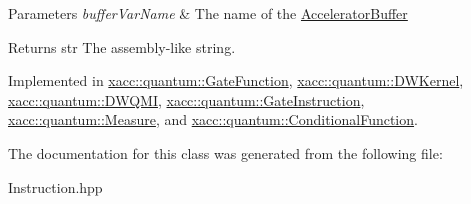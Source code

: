\begin{DoxyParams}{Parameters}
{\em buffer\+Var\+Name} & The name of the \hyperlink{a00019}{Accelerator\+Buffer} \\
\hline
\end{DoxyParams}
\begin{DoxyReturn}{Returns}
str The assembly-\/like string. 
\end{DoxyReturn}


Implemented in \hyperlink{a00061_aa1950776ae84bad2d0795a0441f910e7}{xacc\+::quantum\+::\+Gate\+Function}, \hyperlink{a00045_adbc3fdd080ebba20bc620b8832979f16}{xacc\+::quantum\+::\+D\+W\+Kernel}, \hyperlink{a00046_a8d8742bb6743cf6e49f95966d05bbec2}{xacc\+::quantum\+::\+D\+W\+Q\+MI}, \hyperlink{a00062_a089a5da67ff40ac1a6f56e64589822d9}{xacc\+::quantum\+::\+Gate\+Instruction}, \hyperlink{a00085_a1c51a5d68294dcb2ba1a9fbea63a730f}{xacc\+::quantum\+::\+Measure}, and \hyperlink{a00037_aca7a5f849fece6fc28a904efee9a3370}{xacc\+::quantum\+::\+Conditional\+Function}.



The documentation for this class was generated from the following file\+:\begin{DoxyCompactItemize}
\item 
Instruction.\+hpp\end{DoxyCompactItemize}
